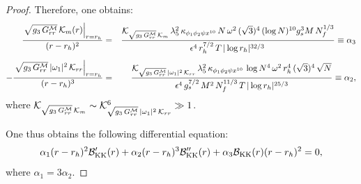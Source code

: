 \documentclass[a4paper,11pt,fleqn]{article}
\theoremstyle{plain}
\theoremstyle{definition}
\newcommand{\rh}{r_h}
\newcommand{\logN}{\log N}
\newcommand{\logrh}{\log r_h}
\begin{document}
\begin{proof}
Therefore, one obtains:
%
\begin{eqnarray}
\label{Nfeff+ders coeff}
\frac{\left.\sqrt{g_3\,G_{rr}^{\mathcal{M}}}\,\mathcal{K}_m(r)\right|_{r=r_h}}{ (r-\rh)^2}
&=& \frac{{\cal K}_{\sqrt{g_3\,G_{rr}^{\mathcal{M}}}\,\mathcal{K}_m}\,\lambda_5^2\,
           \kappa_{\phi_1\phi_2\psi x^{10}}\,N\,\omega^2\,
           (\sqrt{3})^4\,(\logN)^{10}g_s^{3}M\,N_f^{1/3}}
          {\epsilon^4\,\rh^{7/2}\,
           T\,|\logrh|^{32/3}\,} \equiv\alpha_3  \nonumber\\[4pt]
%
-\frac{\left.\sqrt{g_3\,G_{rr}^{\mathcal{M}}}\,|\omega_1|^2\,\mathcal{K}_{rr}\right|_{r=r_h}}{(r-\rh)^3}
&=& \frac{{\cal K}_{\sqrt{g_3\,G_{rr}^{\mathcal{M}}}\,|\omega_1|^2\,\mathcal{K}_{rr}}\,\lambda_5^2\,
          \kappa_{\phi_1\phi_2\psi x^{10}}\,\logN^4\,\omega^2\,\rh^{4}\,
          (\sqrt{3})^4\,\sqrt{N}}
         {\epsilon^4\,g_s^{7/2}\,M^2\,N_f^{11/3}\,T\,
          |\logrh|^{25/3}}\equiv \alpha_2,
\end{eqnarray}
where ${\cal K}_{\sqrt{g_3\,G_{rr}^{\mathcal{M}}}\,\mathcal{K}_m}\sim{\cal K}_{\sqrt{g_3\,G_{rr}^{\mathcal{M}}}\,|\omega_1|^2\,\mathcal{K}_{rr}}^6\gg1$.


One thus obtains the following differential equation:
\begin{equation}
\label{B(r)-EOM}
{\alpha_1} (r-{r_h})^2 {\cal B}_{\rm KK}'(r)+{\alpha_2}
   (r-{r_h})^3 {\cal B}_{\rm KK}''(r)+{\alpha_3} {\cal B}_{\rm KK}(r)
   (r-{r_h})^2=0,
\end{equation}
where $\alpha_1 = 3 \alpha_2$.



\end{proof}
\end{document}
